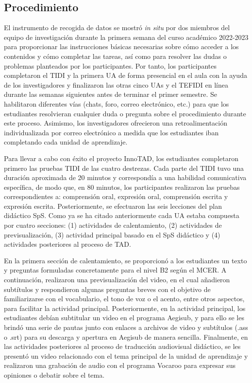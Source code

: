 \documentclass[spanish]{textolivre}
\begin{document}
\subsection{Procedimiento}\label{sec-3.3}
El instrumento de recogida de datos se mostró \textit{in situ} por dos miembros del equipo de investigación durante la primera semana del curso académico 2022-2023 para proporcionar las instrucciones básicas necesarias sobre cómo acceder a los contenidos y cómo completar las tareas, así como para resolver las dudas o problemas planteados por los participantes. Por tanto, los participantes completaron el TIDI y la primera UA de forma presencial en el aula con la ayuda de los investigadores y finalizaron las otras cinco UAs y el TEFIDI en línea durante las semanas siguientes antes de terminar el primer semestre. Se habilitaron diferentes vías (chats, foro, correo electrónico, etc.) para que los estudiantes resolvieran cualquier duda o pregunta sobre el procedimiento durante este proceso. Asimismo, los investigadores ofrecieron una retroalimentación individualizada por correo electrónico a medida que los estudiantes iban completando cada unidad de aprendizaje.

Para llevar a cabo con éxito el proyecto InnoTAD, los estudiantes completaron primero las pruebas TIDI de las cuatro destrezas. Cada parte del TIDI tuvo una duración aproximada de 20 minutos y correspondía a una habilidad comunicativa específica, de modo que, en 80 minutos, los participantes realizaron las pruebas correspondientes a: comprensión oral, expresión oral, comprensión escrita y expresión escrita. Posteriormente, se efectuaron las seis lecciones del plan didáctico SpS. Como ya se ha citado anteriormente cada UA estaba compuesta por cuatro secciones: (1) actividades de calentamiento, (2) actividades de previsualización, (3) actividad principal basado en el SpS didáctico y (4) actividades posteriores al proceso de TAD.

En la primera sección de calentamiento, se proporcionó a los estudiantes un texto y preguntas formuladas concretamente para el nivel B2 según el MCER. A continuación, realizaron una previsualización del video, en el cual añadieron subtítulos y respondieron algunas preguntas breves con el objetivo de familiarizarse con el vocabulario, el tono de voz o el acento, entre otros aspectos, para facilitar la actividad principal. Posteriormente, en la actividad principal, los estudiantes debían subtitular un video en el programa Aegisub, y para ello se les brindó una serie de pautas junto con enlaces a archivos de video y subtítulos (.ass o .srt) para su descarga y apertura en Aegisub de manera sencilla. Finalmente, en las actividades posteriores al proceso de traducción audiovisual didáctico, se les presentó un video relacionado con el tema principal de la unidad de aprendizaje y realizaron una grabación de audio con el programa Vocaroo para expresar sus opiniones o debatir sobre el tema.
\end{document}
